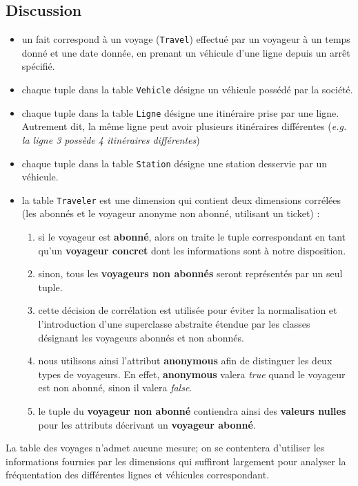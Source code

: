 \documentclass[a4paper,12pt]{report}
\begin{document}
\newpage

\subsection{Discussion}
\begin{itemize}
  \item un fait correspond à un voyage (\texttt{Travel}) effectué par un voyageur à un temps donné et une date donnée, en prenant un véhicule d'une ligne depuis un arrêt spécifié.
  \item chaque tuple dans la table \texttt{Vehicle} désigne un véhicule possédé par la société.
  \item chaque tuple dans la table \texttt{Ligne} désigne une itinéraire prise par une ligne. Autrement dit, la même ligne peut avoir plusieurs itinéraires différentes (\textit{e.g. la ligne 3 possède 4 itinéraires différentes})
  \item chaque tuple dans la table \texttt{Station} désigne une station desservie par un véhicule.
  \item la table \texttt{Traveler} est une dimension qui contient deux dimensions corrélées (les abonnés et le voyageur anonyme non abonné, utilisant un ticket) :
  \begin{enumerate}
    \item si le voyageur est \textbf{abonné}, alors on traite le tuple correspondant en tant qu'un \textbf{voyageur concret} dont les informations sont à notre disposition.
    \item sinon, tous les \textbf{voyageurs non abonnés} seront représentés par un seul tuple.
    \item cette décision de corrélation est utilisée pour éviter la normalisation et l'introduction d'une superclasse abstraite étendue par les classes désignant les voyageurs abonnés et non abonnés.
    \item nous utilisons ainsi l'attribut \textbf{anonymous} afin de distinguer les deux types de voyageurs. En effet, \textbf{anonymous} valera \textit{true} quand le voyageur est non abonné, sinon il valera \textit{false}.
    \item le tuple du \textbf{voyageur non abonné} contiendra ainsi des \textbf{valeurs nulles} pour les attributs décrivant un \textbf{voyageur abonné}.
  \end{enumerate}
\end{itemize}

La table des voyages n'admet aucune mesure; on se contentera d'utiliser les informations fournies par les dimensions qui suffiront largement pour analyser la fréquentation des différentes lignes et véhicules correspondant.
\end{document}
